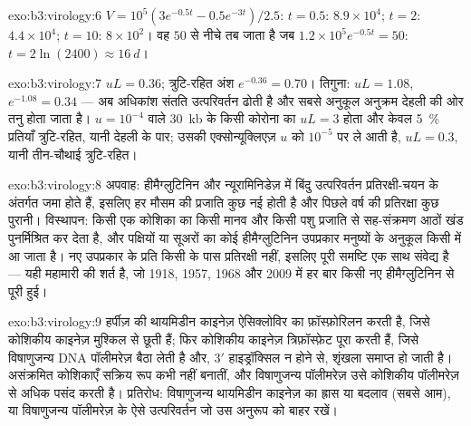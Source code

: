 \begin{solution}{exo:b3:virology:6}
$V = 10^{5}(3e^{-0.5t} - 0.5e^{-3t})/2.5$: $t = 0.5$: $8.9\times
10^{4}$; $t = 2$: $4.4\times 10^{4}$; $t = 10$: $8\times 10^{2}$। वह
$50$ से नीचे तब जाता है जब $1.2\times 10^{5}e^{-0.5t} = 50$: $t = 2\ln(2400) \approx
\qty{16}{d}$।
\end{solution}

\begin{solution}{exo:b3:virology:7}
$uL = 0.36$; त्रुटि-रहित अंश $e^{-0.36} = 0.70$। तिगुना: $uL =
1.08$, $e^{-1.08} = 0.34$ --- अब अधिकांश संतति उत्परिवर्तन ढोती है और
सबसे अनुकूल अनुक्रम देहली की ओर तनु होता जाता है। $u = 10^{-4}$ वाले
\qty{30}{kb} के किसी कोरोना  का $uL = 3$ होता और केवल \qty{5}{\%}
प्रतियाँ त्रुटि-रहित, यानी देहली के पार; उसकी एक्सोन्यूक्लिएज़ $u$ को
$10^{-5}$ पर ले आती है, $uL = 0.3$, यानी तीन-चौथाई त्रुटि-रहित।
\end{solution}

\begin{solution}{exo:b3:virology:8}
अपवाह: हीमैग्लुटिनिन और न्यूरामिनिडेज़ में बिंदु उत्परिवर्तन
प्रतिरक्षी-चयन के अंतर्गत जमा होते हैं, इसलिए हर मौसम की प्रजाति
कुछ नई होती है और पिछले वर्ष की प्रतिरक्षा कुछ पुरानी। विस्थापन: किसी
एक कोशिका का किसी मानव और किसी पशु प्रजाति से सह-संक्रमण आठों खंड
पुनर्मिश्रित कर देता है, और पक्षियों या सूअरों का कोई हीमैग्लुटिनिन
उपप्रकार मनुष्यों के अनुकूल किसी  में आ जाता है। नए उपप्रकार के
प्रति किसी के पास प्रतिरक्षी नहीं, इसलिए पूरी समष्टि एक साथ संवेद्य है
--- यही महामारी की शर्त है, जो 1918, 1957, 1968 और 2009 में हर बार किसी
नए हीमैग्लुटिनिन से पूरी हुई।
\end{solution}

\begin{solution}{exo:b3:virology:9}
हर्पीज़  की थायमिडीन काइनेज़ ऐसिक्लोविर का फ़ॉस्फ़ोरिलन करती है,
जिसे कोशिकीय काइनेज़ मुश्किल से छूती हैं; फिर कोशिकीय काइनेज़ त्रिफ़ॉस्फ़ेट
पूरा करती हैं, जिसे विषाणुजन्य DNA पॉलीमरेज़ बैठा लेती है और, 3$'$
हाइड्रॉक्सिल न होने से, शृंखला समाप्त हो जाती है। असंक्रमित कोशिकाएँ
सक्रिय रूप कभी नहीं बनातीं, और विषाणुजन्य पॉलीमरेज़ उसे कोशिकीय
पॉलीमरेज़ से अधिक पसंद करती है। प्रतिरोध: विषाणुजन्य थायमिडीन काइनेज़
का ह्रास या बदलाव (सबसे आम), या विषाणुजन्य पॉलीमरेज़ के ऐसे
उत्परिवर्तन जो उस अनुरूप को बाहर रखें।
\end{solution}

